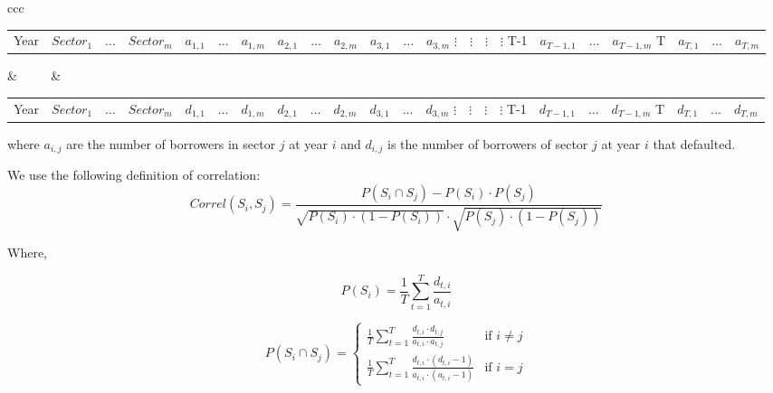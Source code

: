 \documentclass[a4paper,12pt,final]{article}
\begin{document}
\begin{center}
\begin{tabular}[]{ccc}
\begin{tabular}[]{c|ccc}
Year     & $Sector_1$   & $\dots$  & $Sector_{m}$ \cr
{}        & $a_{1,1}$    & $\dots$  & $a_{1,m}$            & $a_{2,1}$    & $\dots$  & $a_{2,m}$            & $a_{3,1}$    & $\dots$  & $a_{3,m}$    \cr
$\vdots$ & $\vdots$     & $\vdots$ & $\vdots$     \cr
T-1      & $a_{T-1,1}$  & $\dots$  & $a_{T-1,m}$  \cr
T        & $a_{T,1}$    & $\dots$  & $a_{T,m}$    \cr
\end{tabular}
& $\qquad$ &
\begin{tabular}[]{c|ccc}
Year     & $Sector_1$   & $\dots$  & $Sector_{m}$ \cr
{}        & $d_{1,1}$    & $\dots$  & $d_{1,m}$            & $d_{2,1}$    & $\dots$  & $d_{2,m}$            & $d_{3,1}$    & $\dots$  & $d_{3,m}$    \cr
$\vdots$ & $\vdots$     & $\vdots$ & $\vdots$     \cr
T-1      & $d_{T-1,1}$  & $\dots$  & $d_{T-1,m}$  \cr
T        & $d_{T,1}$    & $\dots$  & $d_{T,m}$    \cr
\end{tabular}
\end{tabular}
\end{center}

where $a_{i,j}$ are the number of borrowers in sector $j$ at year $i$ and
$d_{i,j}$ is the number of borrowers of sector $j$ at year $i$ that defaulted.
\newline

We use the following definition of correlation:
\begin{displaymath}
Correl(S_i,S_j) = \frac{P(S_i \cap S_j) - P(S_i) \cdot P(S_j)}{\sqrt{P(S_i) \cdot (1-P(S_i))} \cdot \sqrt{P(S_j) \cdot (1-P(S_j))}}
\end{displaymath}

Where,

\begin{displaymath}
P(S_i) = \frac{1}{T} \sum_{t=1}^{T} \frac{d_{t,i}}{a_{t,i}}
\end{displaymath}

\begin{displaymath}
P(S_i \cap S_j) = \left\{
\begin{array}{ll}
\frac{1}{T} \sum_{t=1}^{T} \frac{d_{t,i} \cdot d_{t,j}}{a_{t,i} \cdot a_{t,j}} & \textrm{if  } i \neq j \\
\frac{1}{T} \sum_{t=1}^{T} \frac{d_{t,i} \cdot (d_{t,i}-1)}{a_{t,i} \cdot (a_{t,i}-1)} & \textrm{if  } i = j
\end{array}
\right.
\end{displaymath}
\end{document}
